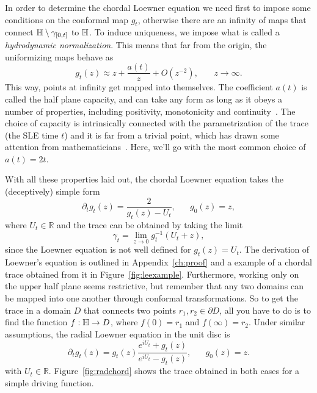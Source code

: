 In order to determine the chordal Loewner equation we need first to impose some
conditions on the conformal map $g_t$, otherwise there are an infinity of maps
that connect $\mathbb{H}\setminus\gamma_{[0,t]}$ to $\mathbb{H}$. To induce uniqueness, we
impose what is called a \textit{hydrodynamic normalization}. This means that
far from the origin, the uniformizing maps behave as
\begin{equation}
    \label{eq:hydro}
    g_{t}\left(z\right)\approx
    z+\frac{a\left(t\right)}{z}+O\left(z^{-2}\right)
    ,\,\,\,\,\,\,\,\,\,\,\,
    z\rightarrow\infty.
\end{equation}
This way, points at infinity get mapped into themselves. The coefficient $a(t)$
is called the half plane capacity, and can take any form as long as it obeys a
number of properties, including positivity, monotonicity and
continuity~\cite{Kager2004}. The choice of capacity is intrinsically connected
with the parametrization of the trace (the SLE time $t$) and it is far from a
trivial point, which has drawn some attention from
mathematicians~\cite{Lawler2011}. Here, we'll go with the most common choice of
$a(t)=2t$.

With all these properties laid out, the chordal Loewner equation takes the
(deceptively) simple form 
\begin{equation}
    \label{eq:loew}
    \partial_t g_t(z) = \frac{2}{g_t(z) - U_t}
    ,\,\,\,\,\,\,\,\,\,\,
    g_0(z)=z,
\end{equation}
where $U_t\in\mathbb{R}$ and the trace can be obtained by taking the limit
\begin{equation}
    \gamma_t = \lim_{z\rightarrow 0}g_t^{-1}\left(U_t + z\right),
\end{equation}
since the Loewner equation is not well defined for $g_t(z)=U_t$. The derivation
of Loewner's equation is outlined in Appendix~\ref{ch:proof} and a example of a
chordal trace obtained from it in Figure~\ref{fig:leexample}. Furthermore,
working only on the upper half plane seems restrictive, but remember that any
two domains can be mapped into one another through conformal transformations.
So to get the trace in a domain $D$ that connects two points $r_1, r_2 \in
\partial D$, all you have to do is to find the function $f:\mathbb{H}\rightarrow D$,
where $f(0)=r_1$ and $f(\infty)=r_2$. Under similar assumptions, the radial
Loewner equation in the unit disc is
\begin{equation}
    \partial_{t}g_{t}\left(z\right)=
    g_{t}\left(z\right)
    \frac{e^{iU_{t}}+g_{t}\left(z\right)}
         {e^{iU_{t}}-g_{t}\left(z\right)}
    ,\,\,\,\,\,\,\,\,\,\,
    g_0(z)=z.
\end{equation}
with $U_t\in\mathbb{R}$. Figure~\ref{fig:radchord} shows the trace
obtained in both cases for a simple driving function.


